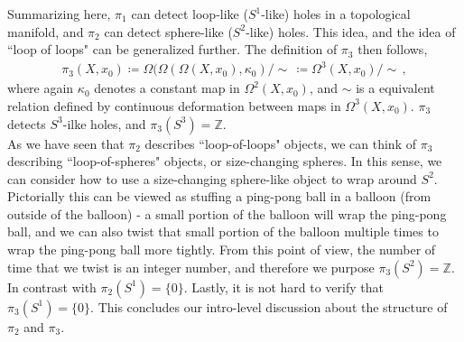 \documentclass[11pt, onesided]{book}
\theoremstyle{break}
\theoremstyle{break}
\newcommand{\Z}{\mathbb{Z}}
\begin{document}
Summarizing here, $\pi_1$ can detect loop-like ($S^1$-like) holes in a topological manifold, and $\pi_2$ can detect sphere-like ($S^2$-like) holes. This idea, and the idea of ``loop of loops" can be generalized further. The definition of $\pi_3$ then follows, 
\begin{align*}
\pi_3(X,x_0) \coloneqq \Omega(\Omega(\Omega(X,x_0), \kappa_0)/\sim\, \coloneqq \Omega^3(X,x_0)/\sim\,, 
\end{align*}
where again $\kappa_0$ denotes a constant map in $\Omega^2(X,x_0)$, and $\sim$ is a equivalent relation defined by continuous deformation between maps in $\Omega^3(X,x_0)$. $\pi_3$ detects $S^3$-ilke holes, and $\pi_3(S^3) = \Z$. \\

As we have seen that $\pi_2$ describes ``loop-of-loops" objects, we can think of $\pi_3$ describing ``loop-of-spheres" objects, or size-changing spheres. In this sense, we can consider how to use a size-changing sphere-like object to wrap around $S^2$. Pictorially this can be viewed as stuffing a ping-pong ball in a balloon (from outside of the balloon) - a small portion of the balloon will wrap the ping-pong ball, and we can also twist that small portion of the balloon multiple times to wrap the ping-pong ball more tightly. From this point of view, the number of time that we twist is an integer number, and therefore we purpose $\pi_3(S^2) = \Z$. In contrast with $\pi_2(S^1)= \{0\}$. Lastly, it is not hard to verify that $\pi_3(S^1) = \{0\}$. This concludes our intro-level discussion about the structure of $\pi_2$ and $\pi_3$.
\end{document}
